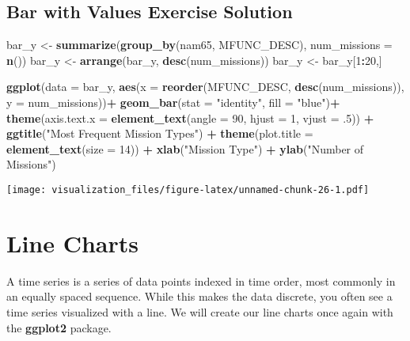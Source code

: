 \documentclass[oneside]{memoir}
\newenvironment{Shaded}{\begin{snugshade}}{\end{snugshade}}
\newcommand{\KeywordTok}[1]{\textcolor[rgb]{0.13,0.29,0.53}{\textbf{#1}}}
\newcommand{\DataTypeTok}[1]{\textcolor[rgb]{0.13,0.29,0.53}{#1}}
\newcommand{\DecValTok}[1]{\textcolor[rgb]{0.00,0.00,0.81}{#1}}
\newcommand{\StringTok}[1]{\textcolor[rgb]{0.31,0.60,0.02}{#1}}
\newcommand{\OperatorTok}[1]{\textcolor[rgb]{0.81,0.36,0.00}{\textbf{#1}}}
\newcommand{\NormalTok}[1]{#1}
\theoremstyle{definition}
\theoremstyle{definition}
\theoremstyle{definition}
\theoremstyle{remark}
\begin{document}
\section{Bar with Values Exercise
Solution}\label{bar-with-values-exercise-solution}

\begin{Shaded}
\begin{Highlighting}[]
\NormalTok{bar_y <-}\StringTok{ }\KeywordTok{summarize}\NormalTok{(}\KeywordTok{group_by}\NormalTok{(nam65, MFUNC_DESC), }\DataTypeTok{num_missions =} \KeywordTok{n}\NormalTok{())}
\NormalTok{bar_y <-}\StringTok{ }\KeywordTok{arrange}\NormalTok{(bar_y, }\KeywordTok{desc}\NormalTok{(num_missions))}
\NormalTok{bar_y <-}\StringTok{ }\NormalTok{bar_y[}\DecValTok{1}\OperatorTok{:}\DecValTok{20}\NormalTok{,]}

\KeywordTok{ggplot}\NormalTok{(}\DataTypeTok{data =}\NormalTok{ bar_y, }\KeywordTok{aes}\NormalTok{(}\DataTypeTok{x =} \KeywordTok{reorder}\NormalTok{(MFUNC_DESC, }\KeywordTok{desc}\NormalTok{(num_missions)), }\DataTypeTok{y =}\NormalTok{ num_missions))}\OperatorTok{+}
\StringTok{  }\KeywordTok{geom_bar}\NormalTok{(}\DataTypeTok{stat =} \StringTok{"identity"}\NormalTok{, }\DataTypeTok{fill =} \StringTok{"blue"}\NormalTok{)}\OperatorTok{+}
\StringTok{  }\KeywordTok{theme}\NormalTok{(}\DataTypeTok{axis.text.x =} \KeywordTok{element_text}\NormalTok{(}\DataTypeTok{angle =} \DecValTok{90}\NormalTok{, }\DataTypeTok{hjust =} \DecValTok{1}\NormalTok{, }\DataTypeTok{vjust =}\NormalTok{ .}\DecValTok{5}\NormalTok{)) }\OperatorTok{+}
\StringTok{  }\KeywordTok{ggtitle}\NormalTok{(}\StringTok{"Most Frequent Mission Types"}\NormalTok{) }\OperatorTok{+}
\StringTok{  }\KeywordTok{theme}\NormalTok{(}\DataTypeTok{plot.title =} \KeywordTok{element_text}\NormalTok{(}\DataTypeTok{size =} \DecValTok{14}\NormalTok{)) }\OperatorTok{+}
\StringTok{  }\KeywordTok{xlab}\NormalTok{(}\StringTok{"Mission Type"}\NormalTok{) }\OperatorTok{+}
\StringTok{  }\KeywordTok{ylab}\NormalTok{(}\StringTok{"Number of Missions"}\NormalTok{)}
\end{Highlighting}
\end{Shaded}

\texttt{[image: visualization\_files/figure-latex/unnamed-chunk-26-1.pdf]}

\chapter{Line Charts}\label{line-charts}

A time series is a series of data points indexed in time order, most
commonly in an equally spaced sequence. While this makes the data
discrete, you often see a time series visualized with a line. We will
create our line charts once again with the \textbf{ggplot2} package.
\end{document}
